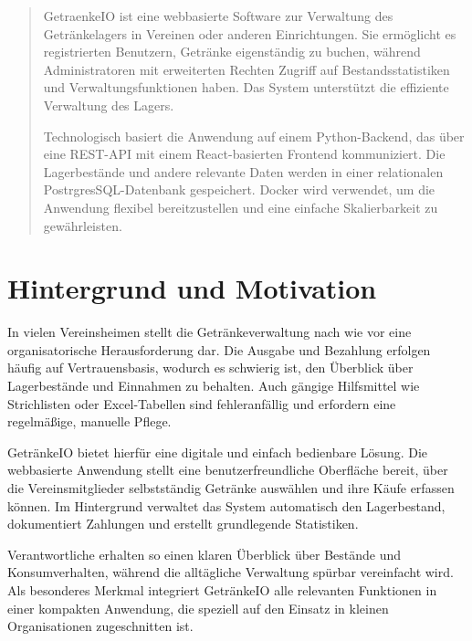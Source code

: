 \documentclass[conference,a4paper]{cs-techrep}
\begin{document}
\selectlanguage{\cstechrepLang}

\maketitle

\begin{abstract}
GetraenkeIO ist eine webbasierte Software zur Verwaltung des Getränkelagers in Vereinen oder anderen Einrichtungen. Sie ermöglicht es registrierten Benutzern, Getränke eigenständig zu buchen, während Administratoren mit erweiterten Rechten Zugriff auf Bestandsstatistiken und Verwaltungsfunktionen haben. Das System unterstützt die effiziente Verwaltung des Lagers.

Technologisch basiert die Anwendung auf einem Python-Backend, das über eine REST-API mit einem React-basierten Frontend kommuniziert. Die Lagerbestände und andere relevante Daten werden in einer relationalen PostrgresSQL-Datenbank gespeichert. Docker wird verwendet, um die Anwendung flexibel bereitzustellen und eine einfache Skalierbarkeit zu gewährleisten.
\end{abstract}


\section{Hintergrund und Motivation}

In vielen Vereinsheimen stellt die Getränkeverwaltung nach wie vor eine organisatorische Herausforderung dar. Die Ausgabe und Bezahlung erfolgen häufig auf Vertrauensbasis, wodurch es schwierig ist, den Überblick über Lagerbestände und Einnahmen zu behalten. Auch gängige Hilfsmittel wie Strichlisten oder Excel-Tabellen sind fehleranfällig und erfordern eine regelmäßige, manuelle Pflege.

GetränkeIO bietet hierfür eine digitale und einfach bedienbare Lösung. Die webbasierte Anwendung stellt eine benutzerfreundliche Oberfläche bereit, über die Vereinsmitglieder selbstständig Getränke auswählen und ihre Käufe erfassen können. Im Hintergrund verwaltet das System automatisch den Lagerbestand, dokumentiert Zahlungen und erstellt grundlegende Statistiken.

Verantwortliche erhalten so einen klaren Überblick über Bestände und Konsumverhalten, während die alltägliche Verwaltung spürbar vereinfacht wird. Als besonderes Merkmal integriert GetränkeIO alle relevanten Funktionen in einer kompakten Anwendung, die speziell auf den Einsatz in kleinen Organisationen zugeschnitten ist.
\end{document}
